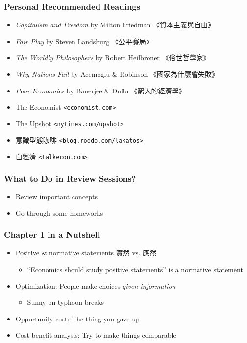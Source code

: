 \documentclass[12pt, xcolor=dvipsnames]{beamer}
\begin{document}
\begin{frame}
\frametitle{\bf Personal Recommended Readings}
\begin{itemize}
\item {\it Capitalism and Freedom} by Milton Friedman \hfill《資本主義與自由》
\item {\it Fair Play} by Steven Landsburg \hfill《公平賽局》
\item {\it The Worldly Philosophers} by Robert Heilbroner \hfill《俗世哲學家》
\item {\it Why Nations Fail} by Acemoglu \& Robinson \hfill《國家為什麼會失敗》
\item {\it Poor Economics} by Banerjee \& Duflo \hfill《窮人的經濟學》
\item The Economist \hfill {\footnotesize\tt{<economist.com>}}
\item The Upshot \hfill {\footnotesize\tt{<nytimes.com/upshot>}}
\item 意識型態咖啡 \hfill {\footnotesize\tt{<blog.roodo.com/lakatos>}}
\item 白經濟 \hfill {\footnotesize\tt{<talkecon.com>}}
\end{itemize}
\end{frame}


\begin{frame}
\frametitle{\bf What to Do in Review Sessions?}
\begin{itemize}
\item Review important concepts
\item Go through some homeworks
\end{itemize}
\end{frame}

\begin{frame}
\frametitle{\bf Chapter 1 in a Nutshell}
\begin{itemize}
\item Positive \& normative statements 實然 vs. 應然
\begin{itemize}
	\item ``Economics should study positive statements'' is a normative statement
\end{itemize}
\item Optimization: People make choices {\it given information}
\begin{itemize}
	\item Sunny on typhoon breaks
\end{itemize}
\item Opportunity cost: The thing you gave up
\item Cost-benefit analysis: Try to make things comparable
\end{itemize}
\end{frame}
\end{document}
